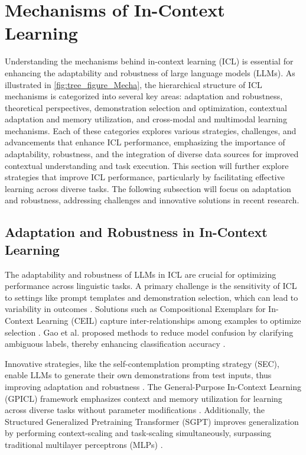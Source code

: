 \section{Mechanisms of In-Context Learning} \label{sec:Mechanisms of In-Context Learning}


Understanding the mechanisms behind in-context learning (ICL) is essential for enhancing the adaptability and robustness of large language models (LLMs). As illustrated in \autoref{fig:tree_figure_Mecha}, the hierarchical structure of ICL mechanisms is categorized into several key areas: adaptation and robustness, theoretical perspectives, demonstration selection and optimization, contextual adaptation and memory utilization, and cross-modal and multimodal learning mechanisms. Each of these categories explores various strategies, challenges, and advancements that enhance ICL performance, emphasizing the importance of adaptability, robustness, and the integration of diverse data sources for improved contextual understanding and task execution. This section will further explore strategies that improve ICL performance, particularly by facilitating effective learning across diverse tasks. The following subsection will focus on adaptation and robustness, addressing challenges and innovative solutions in recent research.



\subsection{Adaptation and Robustness in In-Context Learning} \label{subsec:Adaptation and Robustness in In-Context Learning}



The adaptability and robustness of LLMs in ICL are crucial for optimizing performance across linguistic tasks. A primary challenge is the sensitivity of ICL to settings like prompt templates and demonstration selection, which can lead to variability in outcomes \cite{voronov2024mindformatconsistentevaluation}. Solutions such as Compositional Exemplars for In-Context Learning (CEIL) capture inter-relationships among examples to optimize selection \cite{ye2023compositionalexemplarsincontextlearning}. Gao et al. proposed methods to reduce model confusion by clarifying ambiguous labels, thereby enhancing classification accuracy \cite{gao2023ambiguity}.

Innovative strategies, like the self-contemplation prompting strategy (SEC), enable LLMs to generate their own demonstrations from test inputs, thus improving adaptation and robustness \cite{zhou2023conanovelcontextawareinstruction}. The General-Purpose In-Context Learning (GPICL) framework emphasizes context and memory utilization for learning across diverse tasks without parameter modifications \cite{wang2024benchmarkinggeneralpurposeincontextlearning}. Additionally, the Structured Generalized Pretraining Transformer (SGPT) improves generalization by performing context-scaling and task-scaling simultaneously, surpassing traditional multilayer perceptrons (MLPs) \cite{abedsoltan2024contextscalingversustaskscalingincontext}.


